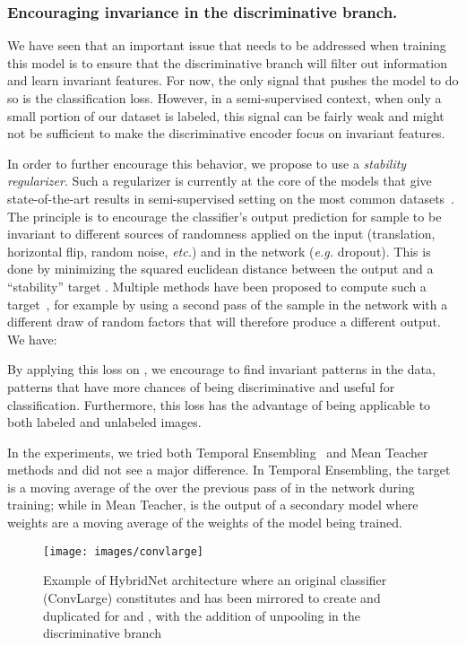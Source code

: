 \documentclass[runningheads]{llncs}
\begin{document}
\subsubsection{Encouraging invariance in the discriminative branch.}

We have seen that an important issue that needs to be addressed when training this model is to ensure that the discriminative branch will filter out information and learn invariant features. For now, the only signal that pushes the model to do so is the classification loss. However, in a semi-supervised context, when only a small portion of our dataset is labeled, this signal can be fairly weak and might not be sufficient to make the discriminative encoder focus on invariant features.

In order to further encourage this behavior, we propose to use a \textit{stability regularizer}. Such a regularizer is currently at the core of the models that give state-of-the-art results in semi-supervised setting on the most common datasets~\cite{Sajjadi2016,Laine2016,Tarvainen2017}. The principle is to encourage the classifier's output prediction  for sample  to be invariant to different sources of randomness applied on the input (translation, horizontal flip, random noise, \textit{etc.}) and in the network (\textit{e.g.} dropout). This is done by minimizing the squared euclidean distance between the output  and a ``stability'' target . Multiple methods have been proposed to compute such a target~\cite{Sajjadi2016,Laine2016,Tarvainen2017}, for example by using a second pass of the sample in the network with a different draw of random factors that will therefore produce a different output. We have:


By applying this loss on , we encourage  to find invariant patterns in the data, patterns that have more chances of being discriminative and useful for classification. Furthermore, this loss has the advantage of being applicable to both labeled and unlabeled images.

In the experiments, we tried both Temporal Ensembling~\cite{Laine2016} and Mean Teacher~\cite{Tarvainen2017} methods and did not see a major difference. In Temporal Ensembling, the target  is a moving average of the  over the previous pass of  in the network during training; while in Mean Teacher,  is the output of a secondary model where weights are a moving average of the weights of the model being trained.


\begin{figure}[tb]
	\centering
	\texttt{[image: images/convlarge]}
    \caption{Example of HybridNet architecture where an original classifier (ConvLarge) constitutes  and has been mirrored to create  and duplicated for  and , with the addition of unpooling in the discriminative branch}
    \label{fig:cifar10-archi}
\end{figure}
\end{document}
